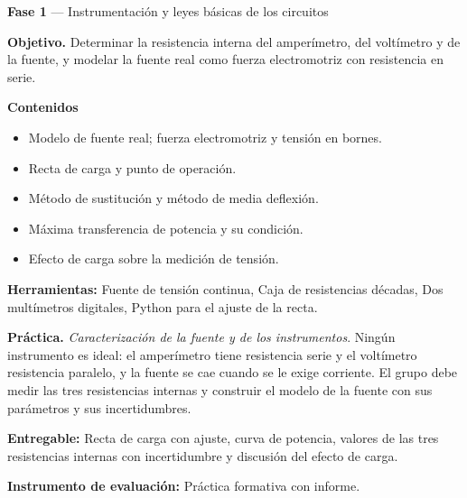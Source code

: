 \documentclass[11pt,a4paper]{article}
\begin{document}
\begin{tcolorbox}[cajaContenido,title={Semana 3 --- Resistencia interna de instrumentos y de una fuente real}]
\textbf{Fase 1} --- Instrumentación y leyes básicas de los circuitos

\textbf{Objetivo.} Determinar la resistencia interna del amperímetro, del voltímetro y de la fuente, y modelar la fuente real como fuerza electromotriz con resistencia en serie.

\textbf{Contenidos}

\begin{itemize}[leftmargin=1.4em,itemsep=2pt,topsep=3pt]
  \item Modelo de fuente real; fuerza electromotriz y tensión en bornes.
  \item Recta de carga y punto de operación.
  \item Método de sustitución y método de media deflexión.
  \item Máxima transferencia de potencia y su condición.
  \item Efecto de carga sobre la medición de tensión.
\end{itemize}

\textbf{Herramientas:} Fuente de tensión continua, Caja de resistencias décadas, Dos multímetros digitales, Python para el ajuste de la recta.

\textbf{Práctica.} \emph{Caracterización de la fuente y de los instrumentos}. Ningún instrumento es ideal: el amperímetro tiene resistencia serie y el voltímetro resistencia paralelo, y la fuente se cae cuando se le exige corriente. El grupo debe medir las tres resistencias internas y construir el modelo de la fuente con sus parámetros y sus incertidumbres.

\textbf{Entregable:} Recta de carga con ajuste, curva de potencia, valores de las tres resistencias internas con incertidumbre y discusión del efecto de carga.

\textbf{Instrumento de evaluación:} Práctica formativa con informe.
\end{tcolorbox}
\end{document}
